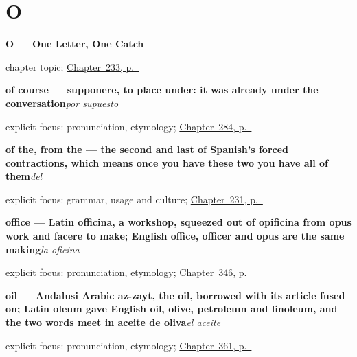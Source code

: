 \section*{O}

\noindent\begin{minipage}[t]{\linewidth}
\raggedright
\textbf{O --- One Letter, One Catch}\par
\footnotesize chapter topic; \hyperref[ch:o]{Chapter~233, p.~\pageref*{ch:o}}
\end{minipage}\par\smallskip

\noindent\begin{minipage}[t]{\linewidth}
\raggedright
\textbf{of course — supponere, to place under: it was already under the conversation}\enspace\emph{por supuesto}\par
\footnotesize explicit focus: pronunciation, etymology; \hyperref[ch:respuestas-cortas]{Chapter~284, p.~\pageref*{ch:respuestas-cortas}}
\end{minipage}\par\smallskip

\noindent\begin{minipage}[t]{\linewidth}
\raggedright
\textbf{of the, from the — the second and last of Spanish's forced contractions, which means once you have these two you have all of them}\enspace\emph{del}\par
\footnotesize explicit focus: grammar, usage and culture; \hyperref[ch:del]{Chapter~231, p.~\pageref*{ch:del}}
\end{minipage}\par\smallskip

\noindent\begin{minipage}[t]{\linewidth}
\raggedright
\textbf{office — Latin officina, a workshop, squeezed out of opificina from opus work and facere to make; English office, officer and opus are the same making}\enspace\emph{la oficina}\par
\footnotesize explicit focus: pronunciation, etymology; \hyperref[ch:lugares-del-pueblo]{Chapter~346, p.~\pageref*{ch:lugares-del-pueblo}}
\end{minipage}\par\smallskip

\noindent\begin{minipage}[t]{\linewidth}
\raggedright
\textbf{oil — Andalusi Arabic az-zayt, the oil, borrowed with its article fused on; Latin oleum gave English oil, olive, petroleum and linoleum, and the two words meet in aceite de oliva}\enspace\emph{el aceite}\par
\footnotesize explicit focus: pronunciation, etymology; \hyperref[ch:la-carne-y-la-leche]{Chapter~361, p.~\pageref*{ch:la-carne-y-la-leche}}
\end{minipage}\par\smallskip

